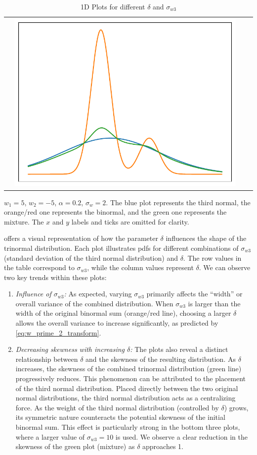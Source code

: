 \begin{table}[!htb]
\begin{tabularx}{\textwidth}{l|@{}Y@{}@{}Y@{}@{}Y@{}}
        & \includegraphics[width = .29\textwidth]{include/figures/1dplotslw100_delta9}
    \end{tabularx}
    \caption{1D Plots for different $\delta$ and $\sigma_{w3}$}
    $w_1 = 5$, $w_2 = -5$, $\alpha = 0.2$, $\sigma_w = 2$.
    The blue plot represents the third normal,
    the orange/red one represents the binormal,
    and the green one represents the mixture.
    The $x$ and $y$ labels and ticks are omitted for clarity.
    \label{tab:1dplotbitri}
\end{table}
 offers a visual representation of how the parameter $\delta$ influences
the shape of the trinormal distribution.
Each plot illustrates \glspl{pdf} for different combinations of $\sigma_{w 3}$
(standard deviation of the third normal distribution) and $\delta$.
The row values in the table correspond to $\sigma_{w 3}$,
while the column values represent $\delta$.
We can observe two key trends within these plots:
\begin{enumerate}
    \item \emph{Influence of $\sigma_{w3}$:}
    As expected, varying $\sigma_{w3}$ primarily affects the \enquote{width}
    or overall variance of the combined distribution.
    When $\sigma_{w3}$ is larger than the width of the original binormal sum (orange/red line),
    choosing a larger $\delta$ allows the overall variance to increase significantly,
    as predicted by \cref{eq:w_prime_2_transform}.

    \item \emph{Decreasing skewness with increasing $\delta$:}
    The plots also reveal a distinct relationship between $\delta$
    and the skewness of the resulting distribution.
    As $\delta$ increases,
    the skewness of the combined trinormal distribution (green line) progressively reduces.
    This phenomenon can be attributed to the placement of the third normal distribution.
    Placed directly between the two original normal distributions,
    the third normal distribution acts as a centralizing force.
    As the weight of the third normal distribution (controlled by $\delta$) grows,
    its symmetric nature counteracts the potential skewness of the initial binormal sum.
    This effect is particularly strong in the bottom three plots,
    where a larger value of $\sigma_{w 3} = 10$ is used.
    We observe a clear reduction in the skewness of the green plot (mixture) as $\delta$ approaches 1.
\end{enumerate}
